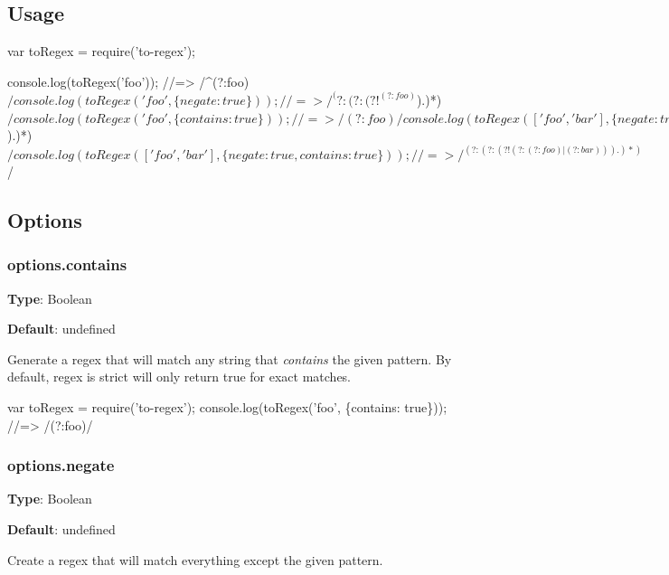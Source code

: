 \subsection*{Usage}


\begin{DoxyCode}
var toRegex = require('to-regex');

console.log(toRegex('foo'));
//=> /^(?:foo)$/

console.log(toRegex('foo', \{negate: true\}));
//=> /^(?:(?:(?!^(?:foo)$).)*)$/

console.log(toRegex('foo', \{contains: true\}));
//=> /(?:foo)/

console.log(toRegex(['foo', 'bar'], \{negate: true\}));
//=> /^(?:(?:(?!^(?:(?:foo)|(?:bar))$).)*)$/

console.log(toRegex(['foo', 'bar'], \{negate: true, contains: true\}));
//=> /^(?:(?:(?!(?:(?:foo)|(?:bar))).)*)$/
\end{DoxyCode}


\subsection*{Options}

\subsubsection*{options.\+contains}

{\bfseries Type}\+: {\ttfamily Boolean}

{\bfseries Default}\+: {\ttfamily undefined}

Generate a regex that will match any string that {\itshape contains} the given pattern. By default, regex is strict will only return true for exact matches.


\begin{DoxyCode}
var toRegex = require('to-regex');
console.log(toRegex('foo', \{contains: true\}));
//=> /(?:foo)/
\end{DoxyCode}


\subsubsection*{options.\+negate}

{\bfseries Type}\+: {\ttfamily Boolean}

{\bfseries Default}\+: {\ttfamily undefined}

Create a regex that will match everything except the given pattern.


